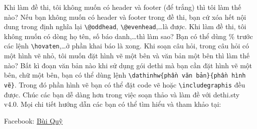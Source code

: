 	\hoi Khi làm đề thi, tôi không muốn có header và footer (để trắng) thì tôi làm thế nào?
	\dap Nếu bạn không muốn có header và footer trong đề thi, bạn cứ xóa hết nội dung trong định nghĩa lại \verb'\@oddhead', \verb'\@evenhead',\ldots là được.
	\hoi Khi làm đề thi, tôi không muốn có dòng họ tên, số báo danh,\ldots thì làm sao?
	\dap Bạn có thể dùng \% trước các lệnh \verb'\hovaten',\ldots ở phần khai báo là xong.
	\hoi Khi soạn câu hỏi, trong câu hỏi có một hình vẽ nhỏ, tôi muốn đặt hình vẽ một bên và văn bản một bên thì làm thế nào?
	\dap Bất kì đoạn văn bản nào khi sử dụng gói dethi mà bạn cần đặt hình vẽ một bên, chữ một bên, bạn có thể dùng lệnh \verb'\dathinhw{phần văn bản}{phần hình vẽ}'. Trong đó phần hình vẽ bạn có thể đặt code vẽ hoặc \verb'\includegraphis' đều được. 
	\vfill
	Chúc các bạn dễ dàng hơn trong việc soạn thảo và làm đề với dethi.sty v4.0. Mọi chi tiết hướng dẫn các bạn có thể tìm hiểu và tham khảo tại:
	
	Facebook: \href{https://www.facebook.com/bvquy77/}{Bùi Quỹ}
	
	
